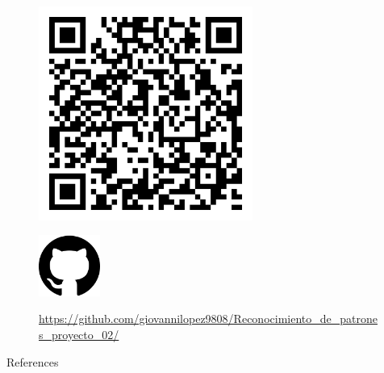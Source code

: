 \begin{frame}
  \vspace{1cm}
  \begin{minipage}{7cm}
    \begin{figure}[H]
      \includegraphics[width=7cm]{Graphics/qr-code.png}
    \end{figure}
  \end{minipage}
  \begin{minipage}{7cm}
    \begin{figure}[H]
      \includegraphics[width=2cm]{Graphics/github.png}\\
      \caption*{\url{https://github.com/giovannilopez9808/Reconocimiento_de_patrones_proyecto_02/}}
    \end{figure}
  \end{minipage}
\end{frame}

\begin{frame}[allowframebreaks]{References}
  
  \nocite{*}
  
\end{frame}
